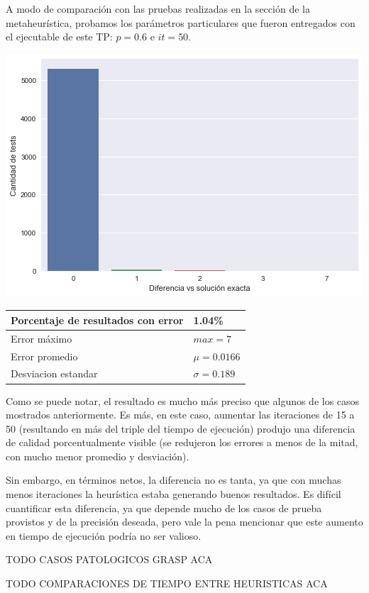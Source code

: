 A modo de comparación con las pruebas realizadas en la sección de la metaheurística, probamos los parámetros particulares que fueron entregados con el ejecutable de este TP: $p = 0.6$ e $it = 50$.

\begin{center}
    \includegraphics[scale=0.6]{img/accuracy-grasp50.png}

    \begin{tabular}{ | l l |}
        \hline
        Porcentaje de resultados con error & 1.04\% \\ \hline
        Error máximo & $max = 7$ \\ \hline
        Error promedio & $\mu = 0.0166$ \\ \hline
        Desviacion estandar & $\sigma = 0.189$ \\
        \hline
    \end{tabular}
\end{center}

Como se puede notar, el resultado es mucho más preciso que algunos de los casos mostrados anteriormente. Es más, en este caso, aumentar las iteraciones de 15 a 50 (resultando en más del triple del tiempo de ejecución) produjo una diferencia de calidad porcentualmente visible (se redujeron los errores a menos de la mitad, con mucho menor promedio y desviación).

Sin embargo, en términos netos, la diferencia no es tanta, ya que con muchas menos iteraciones la heurística estaba generando buenos resultados. Es difícil cuantificar esta diferencia, ya que depende mucho de los casos de prueba provistos y de la precisión deseada, pero vale la pena mencionar que este aumento en tiempo de ejecución podría no ser valioso.

TODO CASOS PATOLOGICOS GRASP ACA

TODO COMPARACIONES DE TIEMPO ENTRE HEURISTICAS ACA